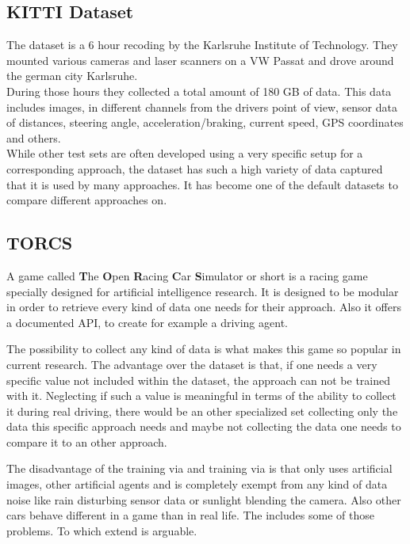 \subsection{KITTI Dataset} \label{subsec: KITTI}

The \kitti dataset is a 6 hour recoding by the Karlsruhe Institute of Technology. They mounted various cameras and laser scanners on a VW Passat and drove around the german city Karlsruhe.\\
During those hours they collected a total amount of 180 GB of data. This data includes images, in different channels from the drivers point of view, sensor data of distances, steering angle, acceleration/braking, current speed, GPS coordinates and others. \\
While other test sets are often developed using a very specific setup for a corresponding approach, the \kitti dataset has such a high variety of data captured that it is used by many approaches. It has become one of the default datasets to compare different approaches on. \cite{KITTI}

\subsection{TORCS} \label{subsec: TORCS}

A game called \textbf{T}he \textbf{O}pen \textbf{R}acing \textbf{C}ar \textbf{S}imulator or short \torcs is a racing game specially designed for artificial intelligence research. It is designed to be modular in order to retrieve every kind of data one needs for their approach. Also it offers a documented API, to create for example a driving agent. 

The possibility to collect any kind of data is what makes this game so popular in current research. The advantage over the \kitti dataset is that, if one needs a very specific value not included within the \kitti dataset, the approach can not be trained with it. Neglecting if such a value is meaningful in terms of the ability to collect it during real driving, there would be an other specialized set collecting only the data this specific approach needs and maybe not collecting the data one needs to compare it to an other approach.

The disadvantage of the training via \torcs and training via \kitti is that \torcs only uses artificial images, other artificial agents and is completely exempt from any kind of data noise like rain disturbing sensor data or sunlight blending the camera. Also other cars behave different in a game than in real life. The \kitti includes some of those problems. To which extend is arguable. \cite{wymann2000torcs}

